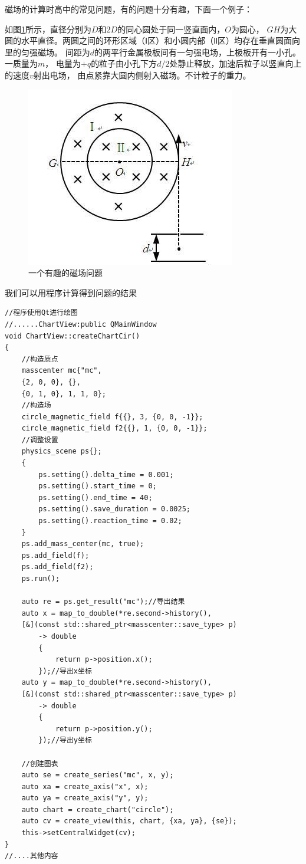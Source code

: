 磁场的计算时高中的常见问题，有的问题十分有趣，下面一个例子：

如图\ref{eg1}所示，直径分别为$D$和$2D$的同心圆处于同一竖直面内，$O$为圆心，
$GH$为大圆的水平直径。两圆之间的环形区域（$Ⅰ$区）和小圆内部（$Ⅱ$区）均存在垂直圆面向里的匀强磁场。
间距为$d$的两平行金属极板间有一匀强电场，上极板开有一小孔。一质量为$m$，
电量为$+q$的粒子由小孔下方$d/2$处静止释放，加速后粒子以竖直向上的速度$v$射出电场，
由点紧靠大圆内侧射入磁场。不计粒子的重力。

\begin{figure} [hb]
    \centering 
    \includegraphics[width=.5\textwidth]{eg.jpeg}
    \caption{一个有趣的磁场问题} 
    \label{eg1}
\end{figure}

我们可以用程序计算得到问题的结果
{\setmainfont{Consolas}
\begin{lstlisting}
//程序使用Qt进行绘图
//......ChartView:public QMainWindow
void ChartView::createChartCir()
{
    //构造质点
    masscenter mc{"mc", 
    {2, 0, 0}, {}, 
    {0, 1, 0}, 1, 1, 0};
    //构造场
    circle_magnetic_field f{{}, 3, {0, 0, -1}};
    circle_magnetic_field f2{{}, 1, {0, 0, -1}};
    //调整设置
    physics_scene ps{};
    {
        ps.setting().delta_time = 0.001;
        ps.setting().start_time = 0;
        ps.setting().end_time = 40;
        ps.setting().save_duration = 0.0025;
        ps.setting().reaction_time = 0.02;
    }
    ps.add_mass_center(mc, true);
    ps.add_field(f);
    ps.add_field(f2);
    ps.run();

    auto re = ps.get_result("mc");//导出结果
    auto x = map_to_double(*re.second->history(),
    [&](const std::shared_ptr<masscenter::save_type> p)
        -> double
        {
            return p->position.x();
        });//导出x坐标
    auto y = map_to_double(*re.second->history(),
    [&](const std::shared_ptr<masscenter::save_type> p)
        -> double
        {
            return p->position.y();
        });//导出y坐标
        
    //创建图表
    auto se = create_series("mc", x, y);
    auto xa = create_axis("x", x);
    auto ya = create_axis("y", y);
    auto chart = create_chart("circle");
    auto cv = create_view(this, chart, {xa, ya}, {se});    
    this->setCentralWidget(cv);
}   
//....其他内容
\end{lstlisting}
}

